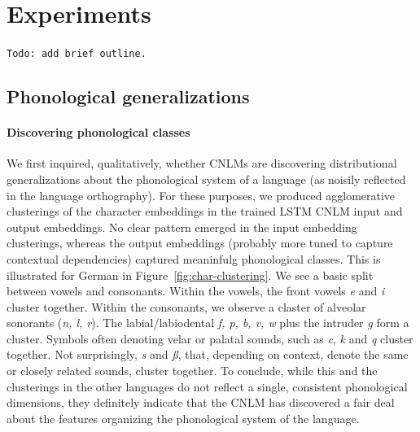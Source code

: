 \section{Experiments}
\label{sec:experiments}

\texttt{Todo: add brief outline.}

\subsection{Phonological generalizations}

\paragraph{Discovering phonological classes} We first inquired,
qualitatively, whether CNLMs are discovering distributional
generalizations about the phonological system of a language (as
noisily reflected in the language orthography). For these purposes, we
produced agglomerative clusterings of the character embeddings in the
trained LSTM CNLM input and output embeddings. No clear pattern
emerged in the input embedding clusterings, whereas the output
embeddings (probably more tuned to capture contextual dependencies)
captured meaninfulg phonological classes. This is illustrated for
German in Figure~\ref{fig:char-clustering}. We see a basic split
between vowels and consonants. Within the vowels, the front vowels
\emph{e} and \emph{i} cluster together. Within the consonants, we
observe a claster of alveolar sonorants (\emph{n, l, r}). The
labial/labiodental \emph{f, p, b, v, w} plus the intruder \emph{g}
form a cluster. Symbols often denoting velar or palatal sounds, such
as \emph{c}, \emph{k} and \emph{q} cluster together. Not surprisingly,
\emph{s} and \emph{{\ss}}, that, depending on context, denote the same
or closely related sounds, cluster together. To conclude, while this
and the clusterings in the other languages do not reflect a single,
consistent phonological dimensions, they definitely indicate that the
CNLM has discovered a fair deal about the features organizing the
phonological system of the language.



